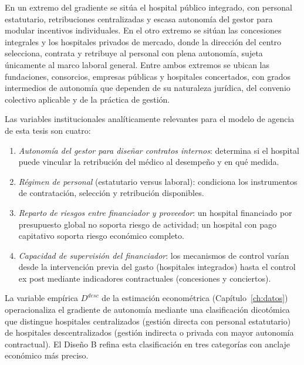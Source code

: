 En un extremo del gradiente se sitúa el hospital público integrado, con personal estatutario, retribuciones centralizadas y escasa autonomía del gestor para modular incentivos individuales. En el otro extremo se sitúan las concesiones integrales y los hospitales privados de mercado, donde la dirección del centro selecciona, contrata y retribuye al personal con plena autonomía, sujeta únicamente al marco laboral general. Entre ambos extremos se ubican las fundaciones, consorcios, empresas públicas y hospitales concertados, con grados intermedios de autonomía que dependen de su naturaleza jurídica, del convenio colectivo aplicable y de la práctica de gestión.

Las variables institucionales analíticamente relevantes para el modelo de agencia de esta tesis son cuatro:

\begin{enumerate}[label=(\roman*)]
  \item \textit{Autonomía del gestor para diseñar contratos internos}: determina si el hospital puede vincular la retribución del médico al desempeño y en qué medida.
  \item \textit{Régimen de personal} (estatutario versus laboral): condiciona los instrumentos de contratación, selección y retribución disponibles.
  \item \textit{Reparto de riesgos entre financiador y proveedor}: un hospital financiado por presupuesto global no soporta riesgo de actividad; un hospital con pago capitativo soporta riesgo económico completo.
  \item \textit{Capacidad de supervisión del financiador}: los mecanismos de control varían desde la intervención previa del gasto (hospitales integrados) hasta el control ex post mediante indicadores contractuales (concesiones y conciertos).
\end{enumerate}

La variable empírica $D^{desc}$ de la estimación econométrica (Capítulo~\ref{ch:datos}) operacionaliza el gradiente de autonomía mediante una clasificación dicotómica que distingue hospitales centralizados (gestión directa con personal estatutario) de hospitales descentralizados (gestión indirecta o privada con mayor autonomía contractual). El Diseño B refina esta clasificación en tres categorías con anclaje económico más preciso.



